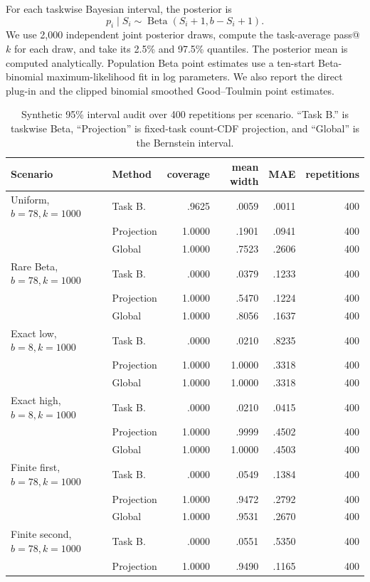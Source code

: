 \documentclass[twoside]{article}
\begin{document}
For each taskwise Bayesian interval, the posterior is
\[
 p_i\mid S_i\sim\operatorname{Beta}(S_i+1,b-S_i+1).
\]
We use 2,000 independent joint posterior draws, compute the task-average
pass@\(k\) for each draw, and take its 2.5\% and 97.5\% quantiles. The
posterior mean is computed analytically. Population Beta point estimates use
a ten-start Beta-binomial maximum-likelihood fit in log parameters. We also
report the direct plug-in and the clipped binomial smoothed Good--Toulmin
point estimates.

\begin{table}[t]
\caption{Synthetic 95\% interval audit over 400 repetitions per scenario.
``Task B.'' is taskwise Beta, ``Projection'' is fixed-task count-CDF
projection, and ``Global'' is the Bernstein interval.}
\label{tab:synthetic-full}
\centering
\small
\begin{tabular}{llrrrr}
\toprule
Scenario & Method & coverage & mean width & MAE & repetitions\\
\midrule
Uniform, \(b=78,k=1000\) & Task B. & .9625 & .0059 & .0011 & 400\\
 & Projection & 1.0000 & .1901 & .0941 & 400\\
 & Global & 1.0000 & .7523 & .2606 & 400\\
\midrule
Rare Beta, \(b=78,k=1000\) & Task B. & .0000 & .0379 & .1233 & 400\\
 & Projection & 1.0000 & .5470 & .1224 & 400\\
 & Global & 1.0000 & .8056 & .1637 & 400\\
\midrule
Exact low, \(b=8,k=1000\) & Task B. & .0000 & .0210 & .8235 & 400\\
 & Projection & 1.0000 & 1.0000 & .3318 & 400\\
 & Global & 1.0000 & 1.0000 & .3318 & 400\\
Exact high, \(b=8,k=1000\) & Task B. & .0000 & .0210 & .0415 & 400\\
 & Projection & 1.0000 & .9999 & .4502 & 400\\
 & Global & 1.0000 & 1.0000 & .4503 & 400\\
\midrule
Finite first, \(b=78,k=1000\) & Task B. & .0000 & .0549 & .1384 & 400\\
 & Projection & 1.0000 & .9472 & .2792 & 400\\
 & Global & 1.0000 & .9531 & .2670 & 400\\
Finite second, \(b=78,k=1000\) & Task B. & .0000 & .0551 & .5350 & 400\\
 & Projection & 1.0000 & .9490 & .1165 & 400\\

\end{tabular}
\end{table}
\end{document}

